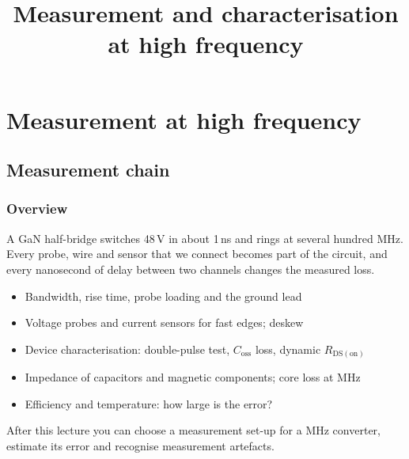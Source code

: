 \title[Measurement at high frequency]{Measurement and characterisation at high frequency}
\section{Measurement at high frequency}

\begin{frame}[plain]
	\titlepage
\end{frame}

\subsection{Measurement chain}

\begin{frame}
	\frametitle{Overview}
	A GaN half-bridge switches 48\,V in about 1\,ns and rings at several hundred MHz. Every probe, wire and sensor that we connect becomes part of the circuit, and every nanosecond of delay between two channels changes the measured loss.
	\begin{itemize}
		\item Bandwidth, rise time, probe loading and the ground lead
		\item Voltage probes and current sensors for fast edges; deskew
		\item Device characterisation: double-pulse test, $C_\mathrm{oss}$ loss, dynamic $R_\mathrm{DS(on)}$
		\item Impedance of capacitors and magnetic components; core loss at MHz
		\item Efficiency and temperature: how large is the error?
	\end{itemize}
	After this lecture you can choose a measurement set-up for a MHz converter, estimate its error and recognise measurement artefacts.
\end{frame}

